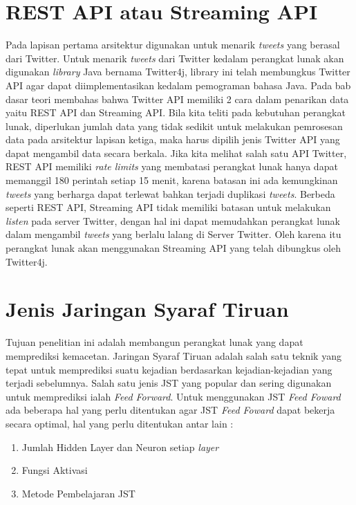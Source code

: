 \section{REST API atau Streaming API}
Pada lapisan pertama arsitektur digunakan untuk menarik \textit{tweets} yang berasal dari Twitter. Untuk menarik \textit{tweets} dari Twitter kedalam perangkat lunak akan digunakan \textit{library} Java bernama Twitter4j, library ini telah membungkus Twitter API agar dapat diimplementasikan kedalam pemograman bahasa Java. Pada bab dasar teori membahas bahwa Twitter API memiliki 2 cara dalam penarikan data yaitu REST API dan Streaming API. Bila kita teliti pada kebutuhan perangkat lunak, diperlukan jumlah data yang tidak sedikit untuk melakukan pemrosesan data pada arsitektur lapisan ketiga, maka harus dipilih jenis Twitter API yang dapat mengambil data secara berkala. Jika kita melihat salah satu API Twitter, REST API memiliki \textit{rate limits} yang membatasi perangkat lunak hanya dapat memanggil 180 perintah setiap 15 menit, karena batasan ini ada kemungkinan \textit{tweets} yang berharga dapat terlewat bahkan terjadi duplikasi \textit{tweets}. Berbeda seperti REST API, Streaming API tidak memiliki batasan untuk melakukan \textit{listen} pada server Twitter, dengan hal ini dapat memudahkan perangkat lunak dalam mengambil \textit{tweets} yang berlalu lalang di Server Twitter. Oleh karena itu perangkat lunak akan menggunakan Streaming API yang telah dibungkus oleh Twitter4j.
\section{Jenis Jaringan Syaraf Tiruan}
Tujuan penelitian ini adalah membangun perangkat lunak yang dapat memprediksi kemacetan. Jaringan Syaraf Tiruan adalah salah satu teknik yang tepat untuk memprediksi suatu kejadian berdasarkan kejadian-kejadian yang terjadi sebelumnya. Salah satu jenis JST yang popular dan sering digunakan untuk memprediksi ialah \textit{Feed Forward}. Untuk menggunakan JST \textit{Feed Foward} ada beberapa hal yang perlu ditentukan agar JST \textit{Feed Foward} dapat bekerja secara optimal, hal yang perlu ditentukan antar lain :
\begin{enumerate}
	\item Jumlah Hidden Layer dan Neuron setiap \textit{layer}
	\item Fungsi Aktivasi
	\item Metode Pembelajaran JST
\end{enumerate}
